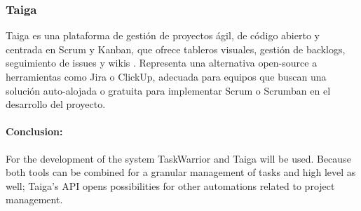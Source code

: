 \subsubsection{Taiga}
Taiga es una plataforma de gestión de proyectos ágil, de código abierto y centrada en Scrum y Kanban, que ofrece tableros visuales, gestión de backlogs, seguimiento de issues y wikis \parencite{Taiga}.
Representa una alternativa open-source a herramientas como Jira o ClickUp, adecuada para equipos que buscan una solución auto-alojada o gratuita para implementar Scrum o Scrumban en el desarrollo del proyecto.



\paragraph{Conclusion:} For the development of the system TaskWarrior and Taiga will be used.
Because both tools can be combined for a granular management of tasks and high level as well; Taiga's API opens possibilities for other automations related to project management.
